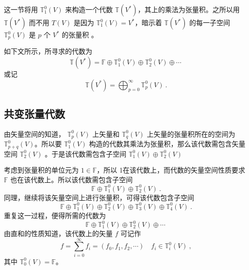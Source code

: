 
\begin{issues}
\end{issues}


这一节将用 $\mathbb T_1^0(V)$ 来构造一个代数 $\mathbb T(V^*)$，其上的乘法为张量积。之所以用 $\mathbb T(V^*)$ 而不用 $T(V)$ 是因为 $\mathbb T_1^0(V)=V^*$，暗示着 $\mathbb T(V^*)$ 的每一子空间 $\mathbb T_p^0(V)$ 是 $p$ 个 $V^*$ 的张量积 。 

如下文所示，所寻求的代数为
\begin{equation}
\mathbb T(V^*)=\mathbb F\oplus\mathbb T_1^0(V)\oplus\mathbb T_2^0(V)\oplus\cdots~
\end{equation}
或记
\begin{equation}
\mathbb T(V^*)=\bigoplus_{p=0}^\infty\mathbb T_p^0(V)~.
\end{equation}
\subsection{共变张量代数}
由矢量空间的知道， $\mathbb T_p^0(V)$ 上矢量和 $\mathbb T_q^0(V)$ 上矢量的张量积所在的空间为  $\mathbb T_{p+q}^0(V)$。所以要 $\mathbb T_1^0(V)$ 构造的代数其乘法为张量积，那么该代数需包含矢量空间 $\mathbb T_2^0(V)$ 。于是该代数需包含子空间 $\mathbb T_1^0(V)\oplus\mathbb T_2^0(V) $

 考虑到张量积的单位元为 $1\in\mathbb F$，所以 1在该代数上，而代数的矢量空间性质要求 $\mathbb F$ 也在该代数上。所以该代数需包含子空间
\begin{equation}
\mathbb F\oplus\mathbb T_1^0(V)\oplus\mathbb T_2^0(V) ~.
\end{equation} 
同理，继续将该矢量空间上进行张量积，可得该代数包含子空间
\begin{equation}
\mathbb F\oplus\mathbb T_1^0(V)\oplus\mathbb T_2^0(V)\oplus\mathbb T_3^0(V)\oplus\mathbb T_4^0(V)~.
\end{equation}
重复这一过程，便得所需的代数为
\begin{equation}
\mathbb F\oplus\mathbb T_1^0(V)\oplus\mathbb T_2^0(V)\oplus\cdots~
\end{equation}
由直和的性质知道，该代数上的矢量 $f$ 可记作
\begin{equation}\label{eq_TenAlg_5}
f=\sum_{i=0}^\infty f_i=(f_0,f_1,f_2,\cdots) \quad f_i\in\mathbb T_i^0(V)~,
\end{equation}
其中 $\mathbb T_0^0(V)=\mathbb F$。

